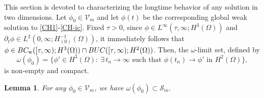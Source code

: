 \documentclass[11pt,reqno]{amsart}
\newtheorem{lemma}[theorem]{Lemma}
\theoremstyle{remark}
\numberwithin{equation}{section}
\begin{document}
This section is devoted to characterizing the longtime behavior of any solution in two dimensions. Let $\phi_0\in \mathcal{V}_m$ and let $\phi(t)$ be the corresponding global weak solution to \eqref{CH1}-\eqref{CH-ic}. Fixed $\tau>0$, since $\phi \in L^\infty(\tau,\infty; H^3(\Omega))$ and $\partial_t \phi \in L^2(0,\infty; H_{(0)}^{-1}(\Omega))$, it immediately follows that $\phi \in BC_{\rm w}([\tau,\infty); H^3(\Omega)) \cap BUC([\tau,\infty); H^2(\Omega))$.
Then, the $\omega$-limit set, defined by
$$
\omega(\phi_0)= \Big\lbrace \phi' \in H^3(\Omega): \ \exists \, t_n \to \infty \text{ such that } \phi(t_n) \to \phi' \text{ in } H^2(\Omega) \Big\rbrace,
$$
is non-empty and compact. %
\begin{lemma}
For any $\phi_0\in \mathcal{V}_m$, we have $\omega(\phi_0)\subset \mathcal{S}_m.$
\end{lemma}
\end{document}
